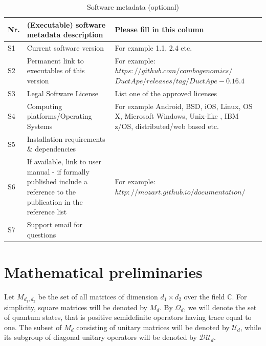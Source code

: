 \documentclass[preprint,12pt, a4paper, dvipsnames]{elsarticle}
\newcommand{\1}{{\rm 1\hspace{-0.9mm}l}}
\newcommand{\DD}{\mathcal{D}}
\newcommand{\UU}{\mathcal{U}}
\newcommand{\HH}{\mathcal{H}}
\begin{document}
\begin{table}[!h]
\begin{tabular}{|l|p{6.5cm}|p{6.5cm}|}
\hline
\textbf{Nr.} & \textbf{(Executable) software metadata description} &
\textbf{Please fill in this column} \\
\hline
S1 & Current software version & For example 1.1, 2.4 etc. \\
\hline
S2 & Permanent link to executables of this version  & For example:
$https://github.com/combogenomics/$ $DuctApe/releases/tag/DuctApe-0.16.4$ \\
\hline
S3 & Legal Software License & List one of the approved licenses \\
\hline
S4 & Computing platforms/Operating Systems & For example Android, BSD, iOS,
Linux, OS X, Microsoft Windows, Unix-like , IBM z/OS, distributed/web based
etc. \\
\hline
S5 & Installation requirements \& dependencies & \\
\hline
S6 & If available, link to user manual - if formally published include a
reference to the publication in the reference list & For example:
$http://mozart.github.io/documentation/$ \\
\hline
S7 & Support email for questions & \\
\hline
\end{tabular}
\caption{Software metadata (optional)}
\label{}
\end{table}

\appendix
\section{Mathematical preliminaries} \label{app:preliminaries}

Let $M_{d_1,d_2}$ be the set of all matrices of dimension $d_1 \times d_2$ over
the field $\mathbb{C}$. For  simplicity, square matrices will be denoted by
$M_d$.
By $\Omega_d$, we will denote the set of quantum states, that is
positive semidefinite operators having trace equal to one.
The subset of $M_d$ consisting of unitary matrices will be denoted
by $\UU_d$, while its subgroup of diagonal unitary operators will be denoted by
$\DD \UU_d$.
\end{document}

